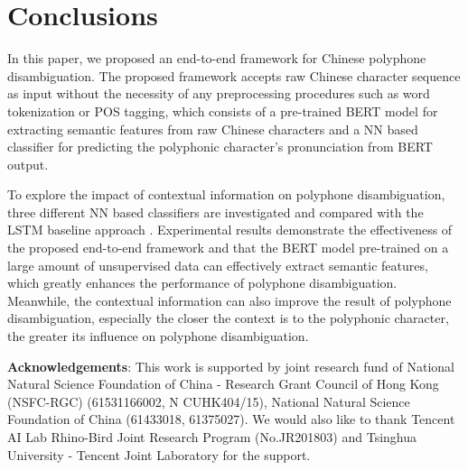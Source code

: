 \documentclass[a4paper]{article}
\begin{document}
\section{Conclusions}

In this paper, we proposed an end-to-end framework for Chinese polyphone disambiguation. The proposed framework accepts raw Chinese character sequence as input without the necessity of any preprocessing procedures such as word tokenization or POS tagging, which consists of a pre-trained BERT model for extracting semantic features from raw Chinese characters and a NN based classifier for predicting the polyphonic character's pronunciation from BERT output.

To explore the impact of contextual information on polyphone disambiguation, three different NN based classifiers are investigated and compared with the LSTM baseline approach \cite{shan2016bi}. Experimental results demonstrate the effectiveness of the proposed end-to-end framework and that the BERT model pre-trained on a large amount of unsupervised data can effectively extract semantic features, which greatly enhances the performance of polyphone disambiguation. Meanwhile, the contextual information can also improve the result of polyphone disambiguation, especially the closer the context is to the polyphonic character, the greater its influence on polyphone disambiguation.



\small  \noindent  \textbf{Acknowledgements}: This work is supported by joint research fund of National Natural Science Foundation of China - Research Grant Council of Hong Kong (NSFC-RGC) (61531166002, N CUHK404/15), National Natural Science Foundation of China (61433018, 61375027). We would also like to thank Tencent AI Lab Rhino-Bird Joint Research Program (No.JR201803) and Tsinghua University - Tencent Joint Laboratory for the support.





\end{document}
